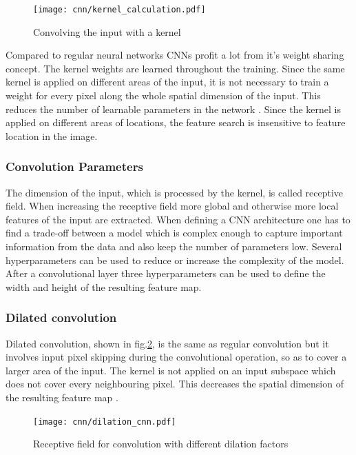 \begin{figure}[htpb]
  \centering
  \texttt{[image: cnn/kernel\_calculation.pdf]}
  \caption {Convolving the input with a kernel \cite{Ganesh2019}}
  \label{fig:kernel}
\end{figure}

Compared to regular neural networks CNNs profit a lot from it's weight sharing concept. The kernel weights are learned throughout the training. Since the same kernel is applied on different areas of the input, it is not necessary to train a weight for every pixel along the whole spatial dimension of the input. This reduces the number of learnable parameters in the network \cite{OShea2015}. Since the kernel is applied on different areas of locations, the feature search is insensitive to feature location in the image.

\subsubsection{Convolution Parameters}

The dimension of the input, which is processed by the kernel, is called receptive field. When increasing the receptive field more global and otherwise more local features of the input are extracted. When defining a CNN architecture one has to find a trade-off between a model which is complex enough to capture important information from the data and also keep the number of parameters low. Several hyperparameters can be used to reduce or increase the complexity of the model. After a convolutional layer three hyperparameters can be used to define the width and height of the resulting feature map. 

\subsubsection{Dilated convolution}
Dilated convolution, shown in fig.\ref{fig:dilated_cnn}, is the same as regular convolution but it involves input pixel skipping during the convolutional operation, so as to cover a larger area of the input. The kernel is not applied on an input subspace which does not cover every neighbouring pixel. This decreases the spatial dimension of the resulting feature map \cite{Ganesh2019}.

\begin{figure}[htpb!]
  \centering
  \texttt{[image: cnn/dilation\_cnn.pdf]}
  \caption {Receptive field for convolution with different dilation factors}
  \label{fig:dilated_cnn}
\end{figure}
\FloatBarrier 

